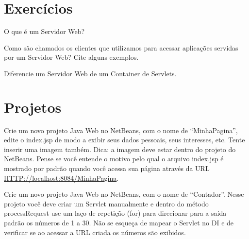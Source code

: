 \section{Exercícios}

\begin{exercicioSemArquivo}{}{}{}
    O que é um Servidor Web?
\end{exercicioSemArquivo}

\begin{exercicioSemArquivo}{}{}{}
    Como são chamados os clientes que utilizamos para acessar aplicações servidas por um Servidor Web? Cite alguns exemplos.
\end{exercicioSemArquivo}

\begin{exercicioSemArquivo}{}{}{}
    Diferencie um Servidor Web de um Container de Servlets.
\end{exercicioSemArquivo}


\section{Projetos}

\begin{projetoSemArquivo}{}{}{}
    Crie um novo projeto Java Web no NetBeans, com o nome de ``MinhaPagina'', edite o index.jsp de modo a exibir seus dados pessoais, seus interesses, etc. Tente inserir uma imagem também. Dica: a imagem deve estar dentro do projeto do NetBeans. Pense se você entende o motivo pelo qual o arquivo index.jsp é mostrado por padrão quando você acessa sua página através da URL \url{HTTP://localhost:8084/MinhaPagina}.
\end{projetoSemArquivo}

\begin{projetoSemArquivo}{}{}{}
    Crie um novo projeto Java Web no NetBeans, com o nome de ``Contador''. Nesse projeto você deve criar um Servlet manualmente e dentro do método processRequest use um laço de repetição (for) para direcionar para a saída padrão os números de 1 a 30. Não se esqueça de mapear o Servlet no DI e de verificar se ao acessar a URL criada os números são exibidos.
\end{projetoSemArquivo}

